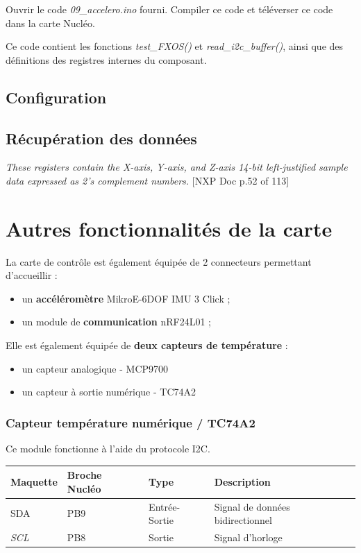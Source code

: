 \documentclass[a4paper,11pt,titlepage]{article} %
\begin{document}
\bigskip

\Manip Ouvrir le code \textsl{09\_accelero.ino} fourni. Compiler ce code et téléverser ce code dans la carte Nucléo.

Ce code contient les fonctions \textsl{test\_FXOS()} et \textsl{read\_i2c\_buffer()}, ainsi que des définitions des registres internes du composant.

\Manip 

\subsection{Configuration}


\subsection{Récupération des données}

\textit{These registers contain the X-axis, Y-axis, and Z-axis 14-bit left-justified sample data expressed as 2's complement numbers.} [NXP Doc p.52 of 113] 


\section{Autres fonctionnalités de la carte}

La carte de contrôle est également équipée de 2 connecteurs permettant d'accueillir :

\begin{itemize}
	\item un \textbf{accéléromètre} MikroE-6DOF IMU 3 Click ;
	\item un module de \textbf{communication} nRF24L01 ;
\end{itemize}

Elle est également équipée de \textbf{deux capteurs de température} :
\begin{itemize}
	\item un capteur analogique - MCP9700
	\item un capteur à sortie numérique - TC74A2
\end{itemize}


\subsubsection{Capteur température numérique / TC74A2}

Ce module fonctionne à l'aide du protocole I2C.

\begin{center}
\begin{tabular}{|l|l|l|l|}
\hline 
Maquette & \textbf{Broche Nucléo} & Type & Description \\ 
\hline 
\textsc{SDA} & PB9 & Entrée-Sortie & Signal de données bidirectionnel \\ 
\textit{SCL} & PB8 & Sortie & Signal d'horloge\\
\hline 
\end{tabular} 
\end{center}
\end{document}
